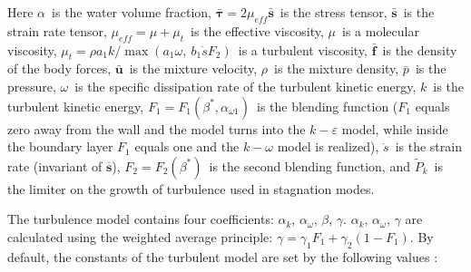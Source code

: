 \documentclass[mathematics,article,submit,pdftex,moreauthors]{Definitions/mdpi}
\begin{document}
Here $\alpha$~is the water volume fraction, $\bar{\boldsymbol{\tau}} = 2 \mu_{eff} \bar{\boldsymbol{s}}$~is the stress tensor, $\bar{\boldsymbol{s}}$~is the strain rate tensor, $\mu_{eff} = \mu + \mu_t$~is the effective viscosity, $\mu$~is a molecular viscosity, $\mu_t = \rho a_1 k / \max(a_1 \omega, \ b_1 \dot{s} F_2)$~is a turbulent viscosity, $\bar{\boldsymbol{f}}$~is the density of the body forces, $\bar{\boldsymbol{u}}$~is the mixture velocity, $\rho$~is the mixture density, $\bar{p}$~is the pressure, $\omega$~is the specific dissipation rate of the turbulent kinetic energy, $k$~is the turbulent kinetic energy, $F_1 = F_1(\beta^*, \alpha_{\omega 1})$~is the blending function ($F_1$ equals zero away from the wall and the model turns into the $k-\varepsilon$ model, while inside the boundary layer $F_1$ equals one and the $k-\omega$ model is realized), $\dot{s}$~is the strain rate (invariant of $\overline{\boldsymbol{s}}$), $F_2 = F_2(\beta^*)$~is the second blending function, and $\widetilde{P}_k$~is the limiter on the growth of turbulence used in stagnation modes.

The turbulence model contains four coefficients: $\alpha_k$, $\alpha_\omega$, $\beta$, $\gamma$. $\alpha_k$, $\alpha_\omega$, $\gamma$ are calculated using the weighted average principle: $\gamma = \gamma_1 F_1 + \gamma_2 (1 - F_1)$. By default, the constants of the turbulent model are set by the following values \cite{LaunderSpalding1974, Tahry1983, LaunderMorseRodiSpaldiug1972}:
\end{document}
